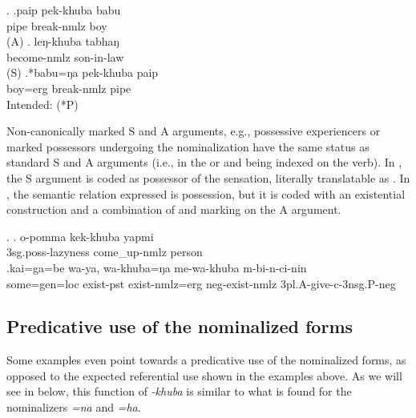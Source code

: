 \ex. \ag.paip pek-khuba babu\\
	pipe break-{\sc nmlz} boy\\
	 (A)
	\bg. leŋ-khuba tabhaŋ\\
	become{\sc -nmlz} son-in-law\\
	 (S)
	 \bg.*babu=ŋa pek-khuba paip\\ 
	boy{\sc =erg} break-{\sc nmlz} pipe		\\ 
	Intended:  (*P)
	
 
Non-canonically marked S and A arguments, e.g., possessive experiencers or  marked possessors undergoing the nominalization have the same status as standard S and A arguments (i.e., in the  or   and being indexed on the verb). In  \Next[a], the  S argument is coded as possessor of the sensation, literally translatable as . In \Next[b], the semantic relation expressed is possession, but it is coded with an existential construction and a combination of  and  marking on the A argument.


\ex. \ag. o-pomma kek-khuba yapmi\\
	{\sc 3sg.poss}-lazyness come\_up-{\sc nmlz} person	\\
\bg.kai=ga=be  wa-ya, wa-khuba=ŋa   me-wa-khuba    m-bi-n-ci-nin\\
		some{\sc =gen=loc} exist{\sc [3sg]-pst}  exist-{\sc nmlz=erg} {\sc neg}-exist-{\sc nmlz} {\sc 3pl.A}-give{\sc [pst]-c-3nsg.P-neg}	\\
	 

	
\subsection{Predicative use of the nominalized forms}
	
\largerpage %
Some examples even point towards a predicative use of the nominalized forms, as opposed to the expected referential use shown in the examples above. As we will see in  below, this function of \emph{-khuba} is similar to what is found for the nominalizers \emph{=na} and \emph{=ha}.

